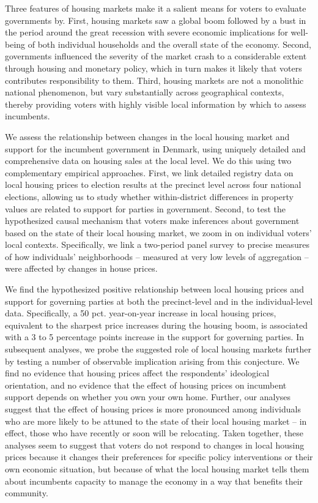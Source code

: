 \documentclass[12pt,a4paper]{article}
\begin{document}
	Three features of housing markets make it a salient means for voters to evaluate governments by. First, housing markets saw a global boom followed by a bust in the period around the great recession with severe economic implications for well-being of both individual households and the overall state of the economy. Second, governments influenced the severity of the market crash to a considerable extent through housing and monetary policy, which in turn makes it likely that voters contributes responsibility to them. Third, housing markets are not a monolithic national phenomenon, but vary substantially across geographical contexts, thereby providing voters with highly visible local information by which to assess incumbents. 
	
	We assess the relationship between changes in the local housing market and support for the incumbent government in Denmark, using uniquely detailed and comprehensive data on housing sales at the local level. We do this using two complementary empirical approaches. First, we link detailed registry data on local housing prices to election results at the precinct level across four national elections, allowing us to study whether within-district differences in property values are related to support for parties in government. Second, to test the hypothesized causal mechanism that voters make inferences about government based on the state of their local housing market, we zoom in on individual voters' local contexts. Specifically, we link a two-period panel survey to precise measures of how individuals' neighborhoods -- measured at very low levels of aggregation -- were affected by changes in house prices.
	
	We find the hypothesized positive relationship between local housing prices and support for governing parties at both the precinct-level and in the individual-level data. Specifically, a 50 pct. year-on-year increase in local housing prices, equivalent to the sharpest price increases during the housing boom, is associated with a 3 to 5 percentage points increase in the support for governing parties. In subsequent analyses, we probe the suggested role of local housing markets further by testing a number of observable implication arising from this conjecture. We find no evidence that housing prices affect the respondents’ ideological orientation, and no evidence that the effect of housing prices on incumbent support depends on whether you own your own home. Further, our analyses suggest that the effect of housing prices is more pronounced among individuals who are more likely to be attuned to the state of their local housing market -- in effect, those who have recently or soon will be relocating. Taken together, these analyses seem to suggest that voters do not respond to changes in local housing prices because it changes their preferences for specific policy interventions or their own economic situation, but because of what the local housing market tells them about incumbents capacity to manage the economy in a way that benefits their community.
	
\end{document}
